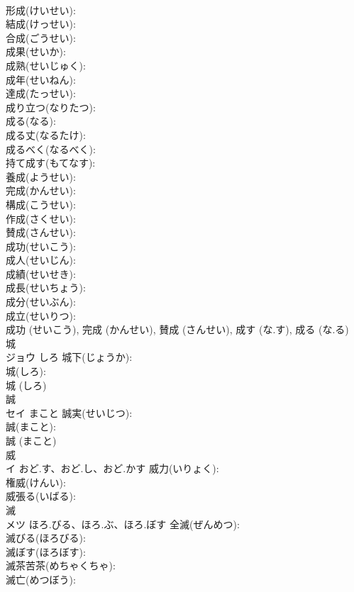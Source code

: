 \documentclass[8pt]{extreport}
\begin{document}
\begin{CJK}{UTF8}{min}
\\	形成(けいせい): 
\\	結成(けっせい): 
\\	合成(ごうせい): 
\\	成果(せいか): 
\\	成熟(せいじゅく): 
\\	成年(せいねん): 
\\	達成(たっせい): 
\\	成り立つ(なりたつ): 
\\	成る(なる): 
\\	成る丈(なるたけ): 
\\	成るべく(なるべく): 
\\	持て成す(もてなす): 
\\	養成(ようせい): 
\\	完成(かんせい): 
\\	構成(こうせい): 
\\	作成(さくせい): 
\\	賛成(さんせい): 
\\	成功(せいこう): 
\\	成人(せいじん): 
\\	成績(せいせき): 
\\	成長(せいちょう): 
\\	成分(せいぶん): 
\\	成立(せいりつ): 
\\	成功 (せいこう), 完成 (かんせい), 賛成 (さんせい), 成す (な.す), 成る (な.る)
\\	城		
\\	ジョウ	しろ	城下(じょうか): 
\\	城(しろ): 
\\	城 (しろ)
\\	誠			
\\	セイ	まこと	誠実(せいじつ): 
\\	誠(まこと): 
\\	誠 (まこと)
\\	威			
\\	イ	おど.す、おど.し、おど.かす	威力(いりょく): 
\\	権威(けんい): 
\\	威張る(いばる): 
\\	滅			
\\	メツ	ほろ.びる、ほろ.ぶ、ほろ.ぼす	全滅(ぜんめつ): 
\\	滅びる(ほろびる): 
\\	滅ぼす(ほろぼす): 
\\	滅茶苦茶(めちゃくちゃ): 
\\	滅亡(めつぼう): 

\end{CJK}
\end{document}
